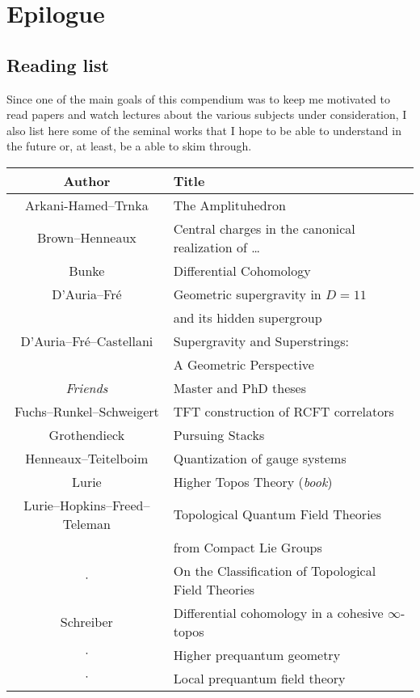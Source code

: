 \chapter{Epilogue}

\section{Reading list}

    Since one of the main goals of this compendium was to keep me motivated to read papers and watch lectures about the various subjects under consideration, I also list here some of the seminal works that I hope to be able to understand in the future or, at least, be a able to skim through.

    \begin{center}
        \begin{tabular}{|c|l|}
            \hline
            Author&Title\\
            \hline
            Arkani-Hamed--Trnka&The Amplituhedron\\
            Brown--Henneaux&Central charges in the canonical realization of \ldots\\
            Bunke&Differential Cohomology\\
            D'Auria--Fr\'e&Geometric supergravity in $D=11$\\
            &\qquad and its hidden supergroup\\
            D'Auria--Fr\'e--Castellani&Supergravity and Superstrings:\\
            &\qquad A Geometric Perspective\\
            \textit{Friends}&Master and PhD theses\\
            Fuchs--Runkel--Schweigert&TFT construction of RCFT correlators\\
            Grothendieck&Pursuing Stacks\\
            Henneaux--Teitelboim&Quantization of gauge systems\\
            Lurie&Higher Topos Theory (\textit{book})\\
            Lurie--Hopkins--Freed--Teleman&Topological Quantum Field Theories\\
            &\qquad from Compact Lie Groups\\
            $\cdot$&On the Classification of Topological Field Theories\\
            Schreiber&Differential cohomology in a cohesive $\infty$-topos\\
            $\cdot$&Higher prequantum geometry\\
            $\cdot$&Local prequantum field theory\\
            \hline
        \end{tabular}
    \end{center}

